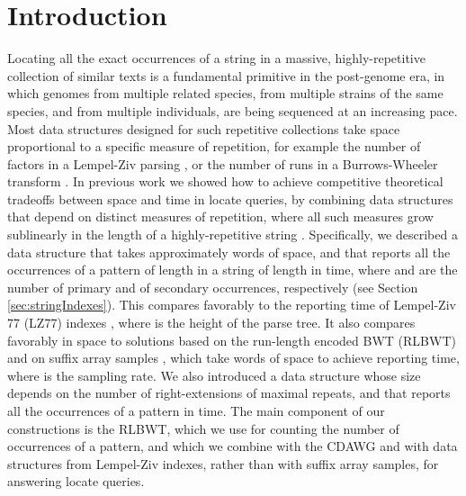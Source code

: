 \documentclass[a4paper,UKenglish]{lipics-v2016}
\begin{document}
\section{Introduction}\label{sec:introduction}

Locating all the exact occurrences of a string in a massive, highly-repetitive collection of similar texts is a fundamental primitive in the post-genome era, in which genomes from multiple related species, from multiple strains of the same species, and from multiple individuals, are being sequenced at an increasing pace. Most data structures designed for such repetitive collections take space proportional to a specific measure of repetition, for example the number  of factors in a Lempel-Ziv parsing \cite{arroyuelo2012stronger,kreft2013compressing}, or the number  of runs in a Burrows-Wheeler transform \cite{MakinenNSV10}. In previous work we showed how to achieve competitive theoretical tradeoffs between space and time in locate queries, by combining data structures that depend on distinct measures of repetition, where all such measures grow sublinearly in the length of a highly-repetitive string \cite{belazzougui2015composite}. Specifically, we described a data structure that takes approximately  words of space, and that reports all the occurrences of a pattern of length  in a string of length  in  time, where  and  are the number of primary and of secondary occurrences, respectively (see Section \ref{sec:stringIndexes}). This compares favorably to the  reporting time of Lempel-Ziv 77 (LZ77) indexes \cite{kreft2013compressing}, where  is the height of the parse tree. It also compares favorably in space to solutions based on the run-length encoded BWT (RLBWT) and on suffix array samples
\cite{MakinenNSV10}, which take  words of space to achieve
 reporting
time, where  is the sampling rate. We also introduced a data structure whose size depends on the number of right-extensions of maximal repeats, and that reports all the  occurrences of a pattern in  time. The main component of our constructions is the RLBWT, which we use for counting the number of occurrences of a pattern, and which we combine with the CDAWG and with data structures from Lempel-Ziv indexes, rather than with suffix array samples, for answering locate queries.
\end{document}
